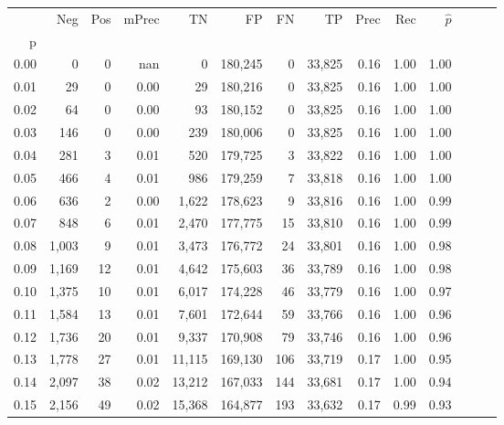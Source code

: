 \begin{tabular}{rrrrrrrrrrrrrr}
\toprule
{} &    Neg &  Pos & mPrec &       TN &       FP &      FN &      TP &  Prec &   Rec & $\hat{p}$ \\
p    &        &      &       &          &          &         &         &       &       &           \\
\midrule
0.00 &      0 &    0 &   nan &        0 &  180,245 &       0 &  33,825 &  0.16 &  1.00 &      1.00 \\
0.01 &     29 &    0 &  0.00 &       29 &  180,216 &       0 &  33,825 &  0.16 &  1.00 &      1.00 \\
0.02 &     64 &    0 &  0.00 &       93 &  180,152 &       0 &  33,825 &  0.16 &  1.00 &      1.00 \\
0.03 &    146 &    0 &  0.00 &      239 &  180,006 &       0 &  33,825 &  0.16 &  1.00 &      1.00 \\
0.04 &    281 &    3 &  0.01 &      520 &  179,725 &       3 &  33,822 &  0.16 &  1.00 &      1.00 \\
0.05 &    466 &    4 &  0.01 &      986 &  179,259 &       7 &  33,818 &  0.16 &  1.00 &      1.00 \\
0.06 &    636 &    2 &  0.00 &    1,622 &  178,623 &       9 &  33,816 &  0.16 &  1.00 &      0.99 \\
0.07 &    848 &    6 &  0.01 &    2,470 &  177,775 &      15 &  33,810 &  0.16 &  1.00 &      0.99 \\
0.08 &  1,003 &    9 &  0.01 &    3,473 &  176,772 &      24 &  33,801 &  0.16 &  1.00 &      0.98 \\
0.09 &  1,169 &   12 &  0.01 &    4,642 &  175,603 &      36 &  33,789 &  0.16 &  1.00 &      0.98 \\
0.10 &  1,375 &   10 &  0.01 &    6,017 &  174,228 &      46 &  33,779 &  0.16 &  1.00 &      0.97 \\
0.11 &  1,584 &   13 &  0.01 &    7,601 &  172,644 &      59 &  33,766 &  0.16 &  1.00 &      0.96 \\
0.12 &  1,736 &   20 &  0.01 &    9,337 &  170,908 &      79 &  33,746 &  0.16 &  1.00 &      0.96 \\
0.13 &  1,778 &   27 &  0.01 &   11,115 &  169,130 &     106 &  33,719 &  0.17 &  1.00 &      0.95 \\
0.14 &  2,097 &   38 &  0.02 &   13,212 &  167,033 &     144 &  33,681 &  0.17 &  1.00 &      0.94 \\
0.15 &  2,156 &   49 &  0.02 &   15,368 &  164,877 &     193 &  33,632 &  0.17 &  0.99 &      0.93 \\

\end{tabular}
